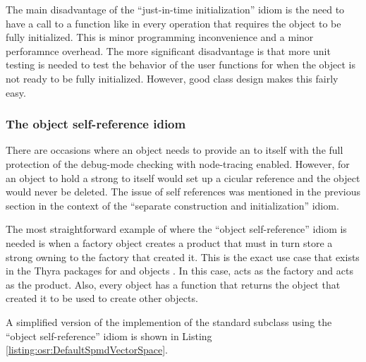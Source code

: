\documentclass[pdf,ps2pdf,11pt]{SANDreport}
\begin{document}
The main disadvantage of the ``just-in-time initialization'' idiom is
the need to have a call to a function like
{} in every operation that requires the
object to be fully initialized.  This is minor programming
inconvenience and a minor perforamnce overhead.  The more significant
disadvantage is that more unit testing is needed to test the behavior
of the user functions for when the object is not ready to be fully
initialized.  However, good class design makes this fairly easy.


%
{}\subsubsection{The object self-reference idiom}
\label{sec:self-references}
%

There are occasions where an object needs to provide an {}
to itself with the full protection of the debug-mode checking with
node-tracing enabled.  However, for an object to hold a strong
{} to itself would set up a cicular reference and the
object would never be deleted.  The issue of self references was
mentioned in the previous section in the context of the ``separate
construction and initialization'' idiom.

The most straightforward example of where the ``object
self-reference'' idiom is needed is when a factory object creates a
product that must in turn store a strong owning {} to the
factory that created it.  This is the exact use case that exists in
the Thyra packages for {} and {}
objects {}\cite{ThyraOperatorVectorSAND}.  In this case,
{} acts as the factory and {}
acts as the product.  Also, every {} object has a
function {} that returns the {}
object that created it to be used to create other {}
objects.

A simplified version of the implemention of the
{} standard subclass
{} using the ``object self-reference''
idiom is shown in Listing {}\ref{listing:osr:DefaultSpmdVectorSpace}.
\end{document}
